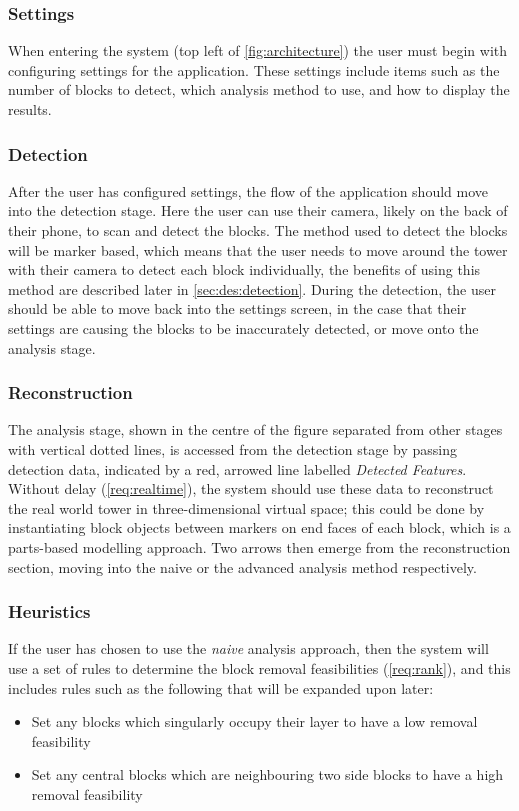 \subsubsection{Settings}

When entering the system (top left of \cref{fig:architecture}) the user must begin with configuring settings for the application. These settings include items such as the number of blocks to detect, which analysis method to use, and how to display the results.

\subsubsection{Detection}

After the user has configured settings, the flow of the application should move into the detection stage. Here the user can use their camera, likely on the back of their phone, to scan and detect the blocks. The method used to detect the blocks will be marker based, which means that the user needs to move around the tower with their camera to detect each block individually, the benefits of using this method are described later in \cref{sec:des:detection}. During the detection, the user should be able to move back into the settings screen, in the case that their settings are causing the blocks to be inaccurately detected, or move onto the analysis stage.

\subsubsection{Reconstruction}

The analysis stage, shown in the centre of the figure separated from other stages with vertical dotted lines, is accessed from the detection stage by passing detection data, indicated by a red, arrowed line labelled \textit{Detected Features}.  Without delay (\cref{req:realtime}), the system should use these data to reconstruct the real world tower in three-dimensional virtual space; this could be done by instantiating block objects between markers on end faces of each block,  which is a parts-based modelling approach. Two arrows then emerge from the reconstruction section, moving into the naive or the advanced analysis method respectively.

\subsubsection{Heuristics}
If the user has chosen to use the \textit{naive} analysis approach, then the system will use a set of rules to determine the block removal feasibilities (\cref{req:rank}), and this includes rules such as the following that will be expanded upon later:
\begin{itemize}
    \item Set any blocks which singularly occupy their layer to have a low removal feasibility
    \item Set any central blocks which are neighbouring two side blocks to have a high removal feasibility
\end{itemize}

